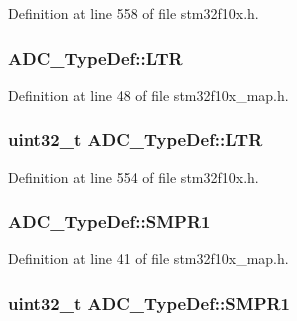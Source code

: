 Definition at line 558 of file stm32f10x.\+h.

\subsubsection[{\texorpdfstring{L\+TR}{LTR}}]{ A\+D\+C\+\_\+\+Type\+Def\+::\+L\+TR}\hypertarget{struct_a_d_c___type_def_a4382206d4129d2ebd6e5c829b5fa4937}{}\label{struct_a_d_c___type_def_a4382206d4129d2ebd6e5c829b5fa4937}


Definition at line 48 of file stm32f10x\+\_\+map.\+h.

\subsubsection[{\texorpdfstring{L\+TR}{LTR}}]{ {\bf uint32\+\_\+t} A\+D\+C\+\_\+\+Type\+Def\+::\+L\+TR}\hypertarget{struct_a_d_c___type_def_afdaf8050fb01739206a92c9ad610f396}{}\label{struct_a_d_c___type_def_afdaf8050fb01739206a92c9ad610f396}


Definition at line 554 of file stm32f10x.\+h.

\subsubsection[{\texorpdfstring{S\+M\+P\+R1}{SMPR1}}]{ A\+D\+C\+\_\+\+Type\+Def\+::\+S\+M\+P\+R1}\hypertarget{struct_a_d_c___type_def_accf9b05406df69b8bd905f187894d5b5}{}\label{struct_a_d_c___type_def_accf9b05406df69b8bd905f187894d5b5}


Definition at line 41 of file stm32f10x\+\_\+map.\+h.

\subsubsection[{\texorpdfstring{S\+M\+P\+R1}{SMPR1}}]{ {\bf uint32\+\_\+t} A\+D\+C\+\_\+\+Type\+Def\+::\+S\+M\+P\+R1}\hypertarget{struct_a_d_c___type_def_a73009a8122fcc628f467a4e997109347}{}\label{struct_a_d_c___type_def_a73009a8122fcc628f467a4e997109347}


